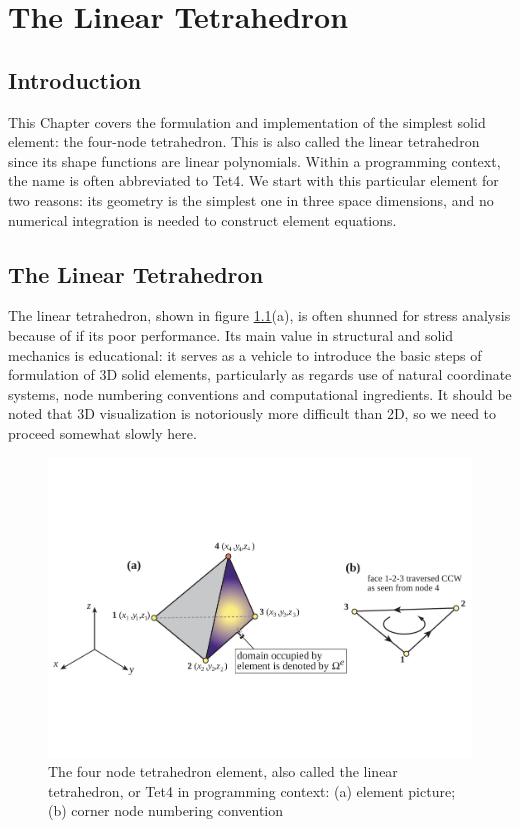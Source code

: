 \chapter{The Linear Tetrahedron}

\section*{Introduction}
This Chapter covers the formulation and implementation of the simplest solid element: the four-node tetrahedron. This is also called the linear tetrahedron since its shape functions are linear polynomials. Within a programming context, the name is often abbreviated to Tet4. We start with this particular element for two reasons: its geometry is the simplest one in three space dimensions, and no numerical integration is needed to construct element equations.

\section{The Linear Tetrahedron}
The linear tetrahedron, shown in figure \ref{fig:tet4_linearTetrahedron}(a), is often shunned for stress analysis because of if its poor performance. Its main value in structural and solid mechanics is educational: it serves as a vehicle to introduce the basic steps of formulation of 3D solid elements, particularly as regards use of natural coordinate systems, node numbering conventions and computational ingredients. It should be noted that 3D visualization is notoriously more difficult than 2D, so we need to proceed somewhat slowly here.

\begin{figure}[h]
\centering
\includegraphics[width=0.7\linewidth]{figure/linearTetrahedron}
\caption{The four node tetrahedron element, also called the linear tetrahedron, or Tet4 in programming context: (a) element picture; (b) corner node numbering convention}
\label{fig:tet4_linearTetrahedron}
\end{figure}


